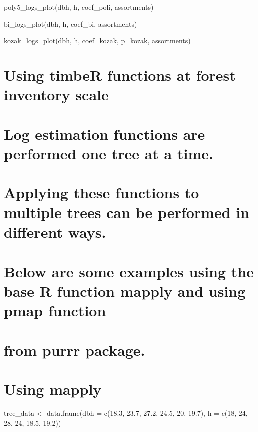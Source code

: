 \documentclass[
]{article}
\begin{document}
poly5\_logs\_plot(dbh, h, coef\_poli, assortments)

bi\_logs\_plot(dbh, h, coef\_bi, assortments)

kozak\_logs\_plot(dbh, h, coef\_kozak, p\_kozak, assortments)

\hypertarget{using-timber-functions-at-forest-inventory-scale}{%
\section{Using timbeR functions at forest inventory
scale}\label{using-timber-functions-at-forest-inventory-scale}}

\hypertarget{log-estimation-functions-are-performed-one-tree-at-a-time.}{%
\section{Log estimation functions are performed one tree at a
time.}\label{log-estimation-functions-are-performed-one-tree-at-a-time.}}

\hypertarget{applying-these-functions-to-multiple-trees-can-be-performed-in-different-ways.}{%
\section{Applying these functions to multiple trees can be performed in
different
ways.}\label{applying-these-functions-to-multiple-trees-can-be-performed-in-different-ways.}}

\hypertarget{below-are-some-examples-using-the-base-r-function-mapply-and-using-pmap-function}{%
\section{Below are some examples using the base R function mapply and
using pmap
function}\label{below-are-some-examples-using-the-base-r-function-mapply-and-using-pmap-function}}

\hypertarget{from-purrr-package.}{%
\section{from purrr package.}\label{from-purrr-package.}}

\hypertarget{using-mapply}{%
\section{Using mapply}\label{using-mapply}}

tree\_data \textless- data.frame(dbh = c(18.3, 23.7, 27.2, 24.5, 20,
19.7), h = c(18, 24, 28, 24, 18.5, 19.2))
\end{document}
